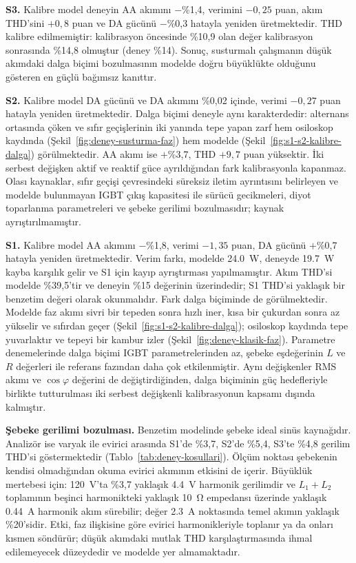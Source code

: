 \textbf{S3.} Kalibre model deneyin AA akımını $-$\%1,4, verimini $-0{,}25$ puan, akım THD'sini $+0{,}8$ puan ve DA gücünü $-$\%0,3 hatayla yeniden üretmektedir. THD kalibre edilmemiştir: kalibrasyon öncesinde \%10,9 olan değer kalibrasyon sonrasında \%14,8 olmuştur (deney \%14). Sonuç, susturmalı çalışmanın düşük akımdaki dalga biçimi bozulmasının modelde doğru büyüklükte olduğunu gösteren en güçlü bağımsız kanıttır.

\textbf{S2.} Kalibre model DA gücünü ve DA akımını \%0,02 içinde, verimi $-0{,}27$ puan hatayla yeniden üretmektedir. Dalga biçimi deneyle aynı karakterdedir: alternans ortasında çöken ve sıfır geçişlerinin iki yanında tepe yapan zarf hem osiloskop kaydında (Şekil~\ref{fig:deney-susturma-faz}) hem modelde (Şekil~\ref{fig:s1-s2-kalibre-dalga}) görülmektedir. AA akımı ise $+$\%3,7, THD $+9{,}7$ puan yüksektir. İki serbest değişken aktif ve reaktif güce ayrıldığından fark kalibrasyonla kapanmaz. Olası kaynaklar, sıfır geçişi çevresindeki süreksiz iletim ayrıntısını belirleyen ve modelde bulunmayan IGBT çıkış kapasitesi ile sürücü gecikmeleri, diyot toparlanma parametreleri ve şebeke gerilimi bozulmasıdır; kaynak ayrıştırılmamıştır.

\textbf{S1.} Kalibre model AA akımını $-$\%1,8, verimi $-1{,}35$ puan, DA gücünü $+$\%0,7 hatayla yeniden üretmektedir. Verim farkı, modelde \SI{24.0}{\watt}, deneyde \SI{19.7}{\watt} kayba karşılık gelir ve S1 için kayıp ayrıştırması yapılmamıştır. Akım THD'si modelde \%39,5'tir ve deneyin \%15 değerinin üzerindedir; S1 THD'si yaklaşık bir benzetim değeri olarak okunmalıdır. Fark dalga biçiminde de görülmektedir. Modelde faz akımı sivri bir tepeden sonra hızlı iner, kısa bir çukurdan sonra az yükselir ve sıfırdan geçer (Şekil~\ref{fig:s1-s2-kalibre-dalga}); osiloskop kaydında tepe yuvarlaktır ve tepeyi bir kambur izler (Şekil~\ref{fig:deney-klasik-faz}). Parametre denemelerinde dalga biçimi IGBT parametrelerinden az, şebeke eşdeğerinin $L$ ve $R$ değerleri ile referans fazından daha çok etkilenmiştir. Aynı değişkenler RMS akımı ve $\cos\varphi$ değerini de değiştirdiğinden, dalga biçiminin güç hedefleriyle birlikte tutturulması iki serbest değişkenli kalibrasyonun kapsamı dışında kalmıştır.

\textbf{Şebeke gerilimi bozulması.} Benzetim modelinde şebeke ideal sinüs kaynağıdır. Analizör ise varyak ile evirici arasında S1'de \%3,7, S2'de \%5,4, S3'te \%4,8 gerilim THD'si göstermektedir (Tablo~\ref{tab:deney-kosullari}). Ölçüm noktası şebekenin kendisi olmadığından okuma evirici akımının etkisini de içerir. Büyüklük mertebesi için: \SI{120}{\volt}'ta \%3,7 yaklaşık \SI{4.4}{\volt} harmonik gerilimdir ve $L_1+L_2$ toplamının beşinci harmonikteki yaklaşık \SI{10}{\ohm} empedansı üzerinde yaklaşık \SI{0.44}{\ampere} harmonik akım sürebilir; değer \SI{2.3}{\ampere} noktasında temel akımın yaklaşık \%20'sidir. Etki, faz ilişkisine göre evirici harmonikleriyle toplanır ya da onları kısmen söndürür; düşük akımdaki mutlak THD karşılaştırmasında ihmal edilemeyecek düzeydedir ve modelde yer almamaktadır.

